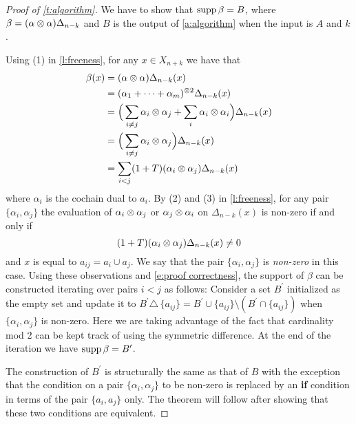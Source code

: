 \begin{proof}[Proof of \cref{t:algorithm}]
	We have to show that $\operatorname{supp} \beta = B$, where $\beta = (\alpha \otimes \alpha) \Delta_{n-k}$ and $B$ is the output of \cref{a:algorithm} when the input is $A$ and $k$.

	Using (1) in \cref{l:freeness}, for any $x \in X_{n+k}$ we have that
	\begin{equation} \label{e:proof correctness}
	\begin{split}
	\beta(x) & =
	(\alpha \otimes \alpha) \Delta_{n-k}(x) \\ & =
	(\alpha_1 + \cdots + \alpha_m)^{\otimes 2} \Delta_{n-k}(x) \\ & =
	\Big(\sum_{i \neq j} \alpha_i \otimes \alpha_j + \sum_{i} \alpha_i \otimes \alpha_i \Big)
	\Delta_{n-k}(x) \\ & =
	\Big(\sum_{i \neq j} \alpha_i \otimes \alpha_j \Big)
	\Delta_{n-k}(x) \\ & =
	\sum_{i < j} (1+T) (\alpha_i \otimes \alpha_j)
	\Delta_{n-k}(x)
	\end{split}
	\end{equation}
	where $\alpha_i$ is the cochain dual to $a_i$.
	By (2) and (3) in \cref{l:freeness}, for any pair $\{\alpha_i, \alpha_j\}$ the evaluation of $\alpha_i \otimes \alpha_j$ or $\alpha_j \otimes \alpha_i$ on $\Delta_{n-k}(x)$ is non-zero if and only if
	\[
	(1+T)(\alpha_i \otimes \alpha_j) \Delta_{n-k}(x) \neq 0
	\]
	and $x$ is equal to $a_{ij} = a_i \cup a_j$.
	We say that the pair $\{\alpha_i, \alpha_j\}$ is  \textit{non-zero} in this case.
	Using these observations and \eqref{e:proof correctness},
	the support of $\beta$ can be constructed iterating over pairs $i < j$ as follows: Consider a set $B^\prime$ initialized as the empty set and update it to $B^\prime \triangle \, \{a_{ij}\} = B^\prime \cup \{a_{ij}\} \setminus (B^\prime \cap \{a_{ij}\})$ when $\{\alpha_i, \alpha_j\}$ is non-zero.
	Here we are taking advantage of the fact that cardinality mod 2 can be kept track of using the symmetric difference.
	At the end of the iteration we have $\operatorname{supp} \beta = B^\prime$.

	The construction of $B^\prime$ is structurally the same as that of $B$ with the exception that the condition on a pair $\{\alpha_i, \alpha_j\}$ to be non-zero is replaced by an \textbf{if} condition in terms of the pair $\{a_i, a_j\}$ only.
	The theorem will follow after showing that these two conditions are equivalent.


\end{proof}
